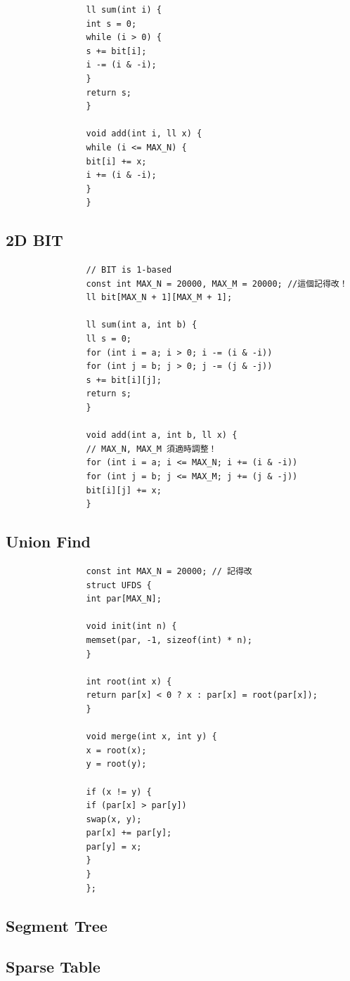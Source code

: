 \documentclass[10pt,oneside]{article}
\begin{document}
\begin{landscape}
\begin{multicols}{2}
\begin{verbatim}
				ll sum(int i) {
				int s = 0;
				while (i > 0) {
				s += bit[i];
				i -= (i & -i);
				}
				return s;
				}
				
				void add(int i, ll x) {
				while (i <= MAX_N) {
				bit[i] += x;
				i += (i & -i);
				}
				}
				\end{verbatim}
				
				\subsection{2D BIT}
				
				\begin{verbatim}
				// BIT is 1-based
				const int MAX_N = 20000, MAX_M = 20000; //這個記得改！
				ll bit[MAX_N + 1][MAX_M + 1];
				
				ll sum(int a, int b) {
				ll s = 0;
				for (int i = a; i > 0; i -= (i & -i))
				for (int j = b; j > 0; j -= (j & -j))
				s += bit[i][j];
				return s;
				}
				
				void add(int a, int b, ll x) {
				// MAX_N, MAX_M 須適時調整！
				for (int i = a; i <= MAX_N; i += (i & -i))
				for (int j = b; j <= MAX_M; j += (j & -j))
				bit[i][j] += x;
				}
				\end{verbatim}
				
				\subsection{Union Find}
				
				\begin{verbatim}
				const int MAX_N = 20000; // 記得改
				struct UFDS {
				int par[MAX_N];
				
				void init(int n) {
				memset(par, -1, sizeof(int) * n);
				}
				
				int root(int x) {
				return par[x] < 0 ? x : par[x] = root(par[x]);
				}
				
				void merge(int x, int y) {
				x = root(x);
				y = root(y);
				
				if (x != y) {
				if (par[x] > par[y])
				swap(x, y);
				par[x] += par[y];
				par[y] = x;
				}
				}
				};
				\end{verbatim}
				
				\subsection{Segment Tree}
				
				\subsection{Sparse Table}
				

\end{multicols}
\end{landscape}
\end{document}
